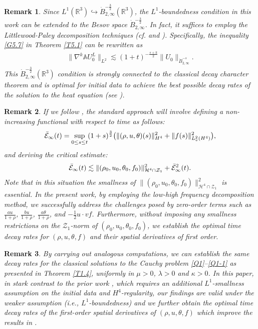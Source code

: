 \documentclass[reqno,11pt]{amsart}
\theoremstyle{plain}
\newtheorem{rem}{Remark}[section]
\numberwithin{equation}{section}
\begin{document}
\begin{rem}
Since $L^1(\mathbb{R}^3) \hookrightarrow \dot{B}^{-\frac{3}{2}}_{2,\infty}(\mathbb{R}^3)$, 
the $L^1$-boundedness condition in this work can be extended to the
 Besov space $\dot{B}^{-\frac{3}{2}}_{2,\infty}$.  In fact, it suffices to employ the 
 Littlewood-Paley decomposition techniques \emph{(}cf. \cite[Section 3.1]{DX-ARMA-2017}
  and \cite{Xu15}\emph{)}. Specifically, the inequality \eqref{G5.7} in Theorem \ref{T5.1} 
  can be rewritten as  
\begin{align*}  
\|\nabla^k \mathbb{A}U_0^L\|_{L^2} \lesssim (1+t)^{-\frac{s+k}{2}} \|U_0\|_{\dot{B}^{-s}_{2,\infty}}.  
\end{align*}  
This $\dot{B}^{-\frac{3}{2}}_{2,\infty}(\mathbb{R}^3)$ condition is strongly connected to 
the classical decay character theorem and is optimal for initial data to achieve the 
best possible decay rates of the solution to the heat equation \emph{(}see \cite{BL,BSXZ}\emph{)}.
\end{rem}

\begin{rem}
If we follow \cite{CDM-krm-2011,Mu-Wang-20}, the standard approach will involve defining 
a non-increasing functional with respect to time as follows:
\begin{align*}  
\Bar{\mathcal{E}}_{\infty}(t) = \sup_{0 \leq s \leq t} (1+s)^{\frac{3}{2}} \big( \|(\rho, u, 
\theta)(s)\|_{H^4}^2 + \|f(s)\|_{L_v^2(H^4)}^2 \big),  
\end{align*}  
and deriving the critical estimate:  
\begin{align*}  
\Bar{\mathcal{E}}_{\infty}(t) \lesssim \|(\rho_0,u_0,\theta_0,f_0)\|_{\mathcal{H}^4 \cap 
\mathcal{Z}_1}^2 + \Bar{\mathcal{E}}_{\infty}^2(t).  
\end{align*}  
Note that in this situation  the smallness of $\|(\rho_0,u_0,\theta_0,f_0)\|_{\mathcal{H}^4 \cap \mathcal{Z}_1}^2$ 
is essential. In the present work, by employing the low-high frequency decomposition method,
 we successfully address the challenges posed by 
 zero-order terms such as $\frac{au}{1+\rho}$, 
 $\frac{bu}{1+\rho}$, $\frac{a\theta}{1+\rho}$, and $-\frac{1}{2}u \cdot v f$. 
 Furthermore, without imposing any smallness restrictions on the $\mathcal{Z}_1$-norm 
 of $(\rho_0, u_0, \theta_0, f_0)$, we establish the optimal time decay rates 
 for $(\rho, u, \theta , f )$ and their spatial derivatives of first order.
\end{rem}


\begin{rem}
By carrying out analogous computations, we can establish the same decay rates for the 
classical solutions to the Cauchy problem \eqref{Q1}--\eqref{Q1-1} as presented in Theorem \ref{T1.4}, 
uniformly in $\mu>0$, $\lambda>0$ and $\kappa > 0$. In this paper, in stark contrast to the prior work 
  \cite{Mu-Wang-20}, which requires an additional $L^1$-smallness assumption on the initial data and 
  $H^4$-regularity, our findings are valid under the weaker assumption \emph{(}i.e.,  $L^1$-boundedness\emph{)} 
  and we further obtain the optimal time decay rates of the first-order spatial derivatives of $(\rho,u,\theta,f)$
which improve the results  in \cite{Mu-Wang-20}.
\end{rem}
\end{document}
